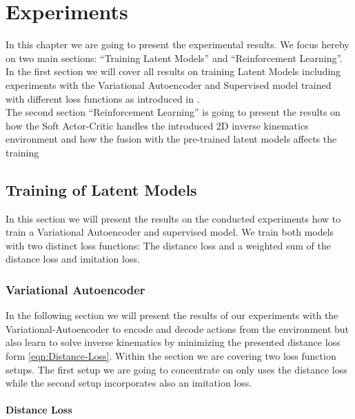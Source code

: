 \chapter{Experiments}\label{chap:experiments}

In this chapter we are going to present the experimental results. We focus hereby on two main sections: ``Training Latent Models'' and ``Reinforcement Learning''. In the first section we will cover all results on training Latent Models including experiments with the Variational Autoencoder and Supervised model trained with different loss functions as introduced in . \\
The second section ``Reinforcement Learning'' is going to present the results on how the Soft Actor-Critic handles the introduced 2D inverse kinematics environment and how the fusion with the pre-trained latent models affects the training


\section{Training of Latent Models}

In this section we will present the results on the conducted experiments how to train a Variational Autoencoder and supervised model. We train both models with two distinct loss functions: The distance loss and a weighted sum of the distance loss and imitation loss. 

\subsection{Variational Autoencoder}

In the following section we will present the results of our experiments with the Variational-Autoencoder to encode and decode actions from the environment but also learn to solve inverse kinematics by minimizing the presented distance loss form \eqref{eqn:Distance-Loss}. Within the section we are covering two loss function setups. The first setup we are going to concentrate on only uses the distance loss while the second setup incorporates also an imitation loss.

\subsubsection{Distance Loss}

